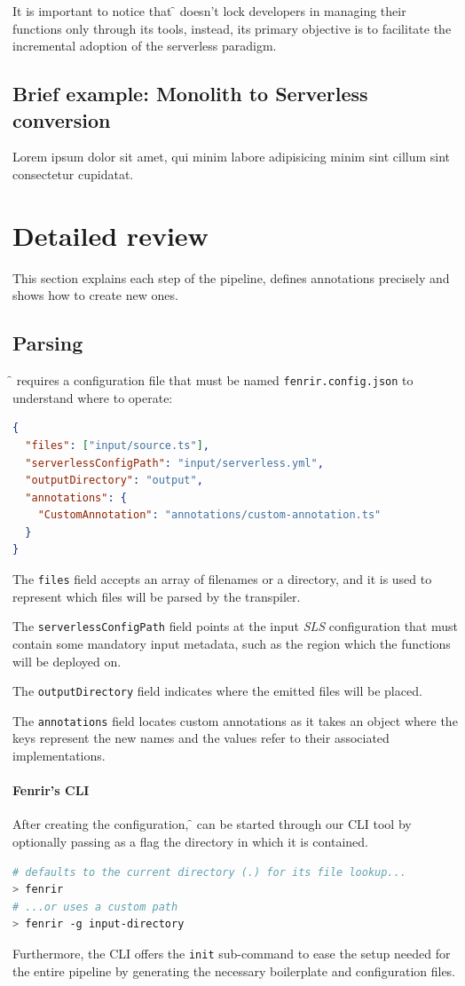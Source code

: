 It is important to notice that \f{} doesn't lock developers in managing their
functions only through its tools, instead, its primary objective is to facilitate
the incremental adoption of the serverless paradigm.

\subsection{Brief example: Monolith to Serverless conversion}

Lorem ipsum dolor sit amet, qui minim labore adipisicing minim sint cillum sint consectetur cupidatat.

\section{Detailed review}

This section explains each step of the pipeline, defines annotations precisely and shows how to create new ones.

\subsection{Parsing}

\f{} requires a configuration file that must be named \verb|fenrir.config.json| to understand where to operate:

\begin{lstlisting}[language=json]
{
  "files": ["input/source.ts"],
  "serverlessConfigPath": "input/serverless.yml",
  "outputDirectory": "output",
  "annotations": {
    "CustomAnnotation": "annotations/custom-annotation.ts"
  }
}
\end{lstlisting}

The \verb|files| field accepts an array of filenames or a directory,
and it is used to represent which files will be parsed by the transpiler.

The \verb|serverlessConfigPath| field points at the input \textit{SLS} configuration
that must contain some mandatory input metadata, such as the region which the functions will be deployed on.

The \verb|outputDirectory| field indicates where the emitted files will be placed.

The \verb|annotations| field locates custom annotations as it takes an object
where the keys represent the new names and the values refer to their associated implementations.

\paragraph{\textbf{Fenrir's CLI}}
After creating the configuration, \f{} can be started through our CLI tool
by optionally passing as a flag the directory in which it is contained.
\begin{lstlisting}[language=bash, style=bashstyle]
# defaults to the current directory (.) for its file lookup...
> fenrir
# ...or uses a custom path
> fenrir -g input-directory
\end{lstlisting}
Furthermore, the CLI offers the \verb|init| sub-command to ease the setup needed for the entire pipeline
by generating the necessary boilerplate and configuration files.

